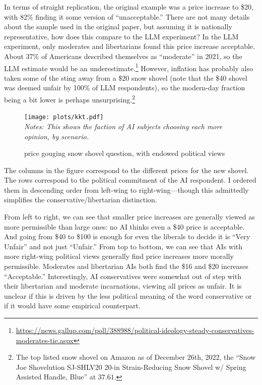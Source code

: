 \documentclass[11pt]{article}
\begin{document}
In terms of straight replication, the original example was a price increase to \$20, with 82\% finding it some version of ``unacceptable.''
There are not many details about the sample used in the original paper, but assuming it is nationally representative, how does this compare to the LLM experiment? 
In the LLM experiment, only moderates and libertarians found this price increase acceptable.
About 37\% of Americans described themselves as ``moderate'' in 2021, so the LLM estimate would be an underestimate.\footnote{
    \href{https://news.gallup.com/poll/388988/political-ideology-steady-conservatives-moderates-tie.aspx}{https://news.gallup.com/poll/388988/political-ideology-steady-conservatives-moderates-tie.aspx}
}
However, inflation has probably also taken some of the sting away from a \$20 snow shovel (note that the \$40 shovel was deemed unfair by 100\% of LLM respondents), so the modern-day fraction being a bit lower is perhaps unsurprising.\footnote{
    The top listed snow shovel on Amazon as of December 26th, 2022, the ``Snow Joe Shovelution SJ-SHLV20 20-in Strain-Reducing Snow Shovel w/ Spring Assisted Handle, Blue'' at $37.61$. 
}

\begin{figure}[h!]
  \caption{\cite{kahneman1986fairness} price gouging snow shovel question, with endowed political views} \label{fig:kkt}
  \centering
  \begin{minipage}{0.99\textwidth}
    \texttt{[image: plots/kkt.pdf]}
{\footnotesize \\
  \emph{Notes: This shows the faction of AI subjects choosing each more opinion, by scenario.} 
}
\end{minipage} 
\end{figure}

The columns in the figure correspond to the different prices for the new shovel. 
The rows correspond to the political commitment of the AI respondent. 
I ordered them in descending order from left-wing to right-wing---though this admittedly simplifies the conservative/libertarian distinction.

From left to right, we can see that smaller price increases are generally viewed as more permissible than large ones: no AI thinks even a \$40 price is acceptable.
And going from \$40 to \$100 is enough for even the liberals to decide it is ``Very Unfair'' and not just ``Unfair.''
From top to bottom, we can see that AIs with more right-wing political views generally find price increases more morally permissible.
Moderates and libertarian AIs both find the \$16 and \$20 increases ``Acceptable.'' 
Interestingly, AI conservatives were somewhat out of step with their libertarian and moderate incarnations, viewing all prices as unfair.
It is unclear if this is driven by the less political meaning of the word conservative or if it would have some empirical counterpart.
\end{document}
